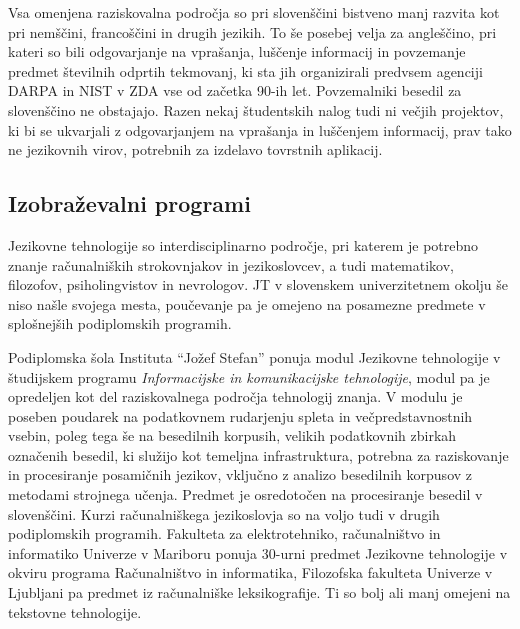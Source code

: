 \begin{multicols}{2}

Vsa omenjena raziskovalna področja so pri slovenščini bistveno manj razvita kot pri nemščini, francoščini in drugih jezikih. To še posebej velja za angleščino, pri kateri so bili odgovarjanje na vprašanja, luščenje informacij in povzemanje predmet številnih odprtih tekmovanj, ki sta jih organizirali predvsem agenciji DARPA in NIST v ZDA vse od začetka 90-ih let. Povzemalniki besedil za slovenščino ne obstajajo. Razen nekaj študentskih nalog tudi ni večjih projektov, ki bi se ukvarjali z odgovarjanjem na vprašanja in luščenjem informacij, prav tako ne jezikovnih virov, potrebnih za izdelavo tovrstnih aplikacij.

\subsection{Izobraževalni programi}

Jezikovne tehnologije so interdisciplinarno področje, pri katerem je potrebno znanje računalniških strokovnjakov in jezikoslovcev, a tudi matematikov, filozofov, psiholingvistov in nevrologov. JT v slovenskem univerzitetnem okolju še niso našle svojega mesta, poučevanje pa je omejeno na posamezne predmete v splošnejših podiplomskih programih.

Podiplomska šola Instituta “Jožef Stefan” ponuja modul Jezikovne tehnologije v študijskem programu \textit{Informacijske in komunikacijske tehnologije}, modul pa je opredeljen kot del raziskovalnega področja tehnologij znanja. V modulu je poseben poudarek na podatkovnem rudarjenju spleta in večpredstavnostnih vsebin, poleg tega še na besedilnih korpusih, velikih podatkovnih zbirkah označenih besedil, ki služijo kot temeljna infrastruktura, potrebna za raziskovanje in procesiranje posamičnih jezikov, vključno z analizo besedilnih korpusov z metodami strojnega učenja. Predmet je osredotočen na procesiranje besedil v slovenščini.
Kurzi računalniškega jezikoslovja so na voljo tudi v drugih podiplomskih programih. Fakulteta za elektrotehniko, računalništvo in informatiko Univerze v Mariboru ponuja 30-urni predmet Jezikovne tehnologije v okviru programa Računalništvo in informatika, Filozofska fakulteta Univerze v Ljubljani pa predmet iz računalniške leksikografije. Ti so bolj ali manj omejeni na tekstovne tehnologije.



\end{multicols}
